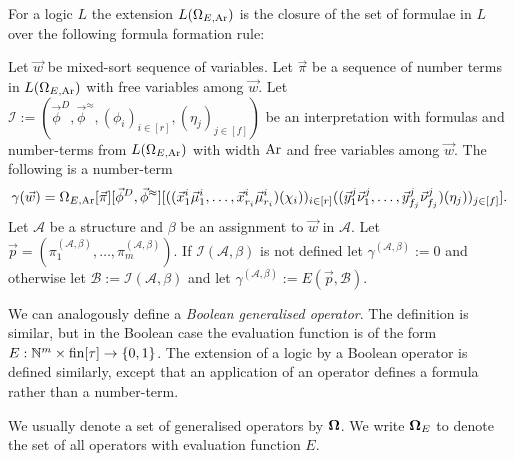 \documentclass[../main/thesis.tex]{subfiles}
\begin{document}
For a logic $L$ the extension $L(\Omega_{E, \text{\upshape Ar}})$ is the closure of the set of
formulae in $L$ over the following formula formation rule:


Let $\vec{w}$ be mixed-sort sequence of variables. Let $\vec{\pi}$ be a sequence
of number terms in $L(\Omega_{E, \text{\upshape Ar}})$ with free variables among $\vec{w}$. Let
$\mathcal{I} := (\vec{\phi}^D, \vec{\phi}^{\approx}, (\phi_i)_{i \in [r]},
(\eta_j)_{j \in [f]})$ be an interpretation with formulas and number-terms from
$L(\Omega_{E, \text{\upshape Ar}})$ with width $\text{\upshape Ar}$ and free variables among $\vec{w}$. The
following is a number-term
\begin{align*}
  \gamma (\vec{w}) = \Omega_{E, \text{\upshape Ar}} [\vec{\pi}] [\vec{\phi}^D, \vec{\phi}^{\approx}]  [((\vec{x}^i_1 \vec{\mu}^i_1, \ldots, \vec{x}^i_{r_i} \vec{\mu}^i_{r_i})(\chi_i))_{i \in [r]}((\vec{y}^j_1 \vec{\nu}^j_1, \ldots, \vec{y}^j_{f_j} \vec{\nu}^j_{f_j})(\eta_j))_{j \in [f]}].
\end{align*}
Let $\mathcal{A}$ be a structure and $\beta$ be an assignment to $\vec{w}$ in
$\mathcal{A}$. Let $\vec{p} = (\pi^{(\mathcal{A}, \beta)}_1, \ldots,
\pi^{(\mathcal{A}, \beta)}_m)$. If $\mathcal{I}(\mathcal{A}, \beta)$ is not
defined let $\gamma^{(\mathcal{A}, \beta)} := 0$ and otherwise let $\mathcal{B}
:= \mathcal{I}(\mathcal{A}, \beta)$ and let $\gamma^{(\mathcal{A}, \beta)} := E
(\vec{p}, \mathcal{B})$.

We can analogously define a \emph{Boolean generalised operator}. The definition
is similar, but in the Boolean case the evaluation function is of the form $E :
\mathbb{N}^{m} \times \text{\upshape fin}{[\tau]} \rightarrow \{0,1\}$. The extension of a logic by a Boolean
operator is defined similarly, except that an application of an operator defines
a formula rather than a number-term.

We usually denote a set of generalised operators by $\mathbf{\mathbf{\Omega}}$. We write
$\mathbf{\mathbf{\Omega}}_E$ to denote the set of all operators with evaluation function $E$.








\end{document}
